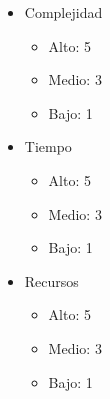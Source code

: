 \documentclass[
11pt, %
]{plan}
\begin{document}
\begin{itemize}
	\item Complejidad
	\begin{itemize}
		\item Alto: 5
		\item Medio: 3
		\item Bajo: 1
	\end{itemize}
	\item Tiempo
	\begin{itemize}
		\item Alto: 5
		\item Medio: 3
		\item Bajo: 1
	\end{itemize}
	\item Recursos
	\begin{itemize}
		\item Alto: 5
		\item Medio: 3
		\item Bajo: 1
	\end{itemize}
\end{itemize}
\end{document}
